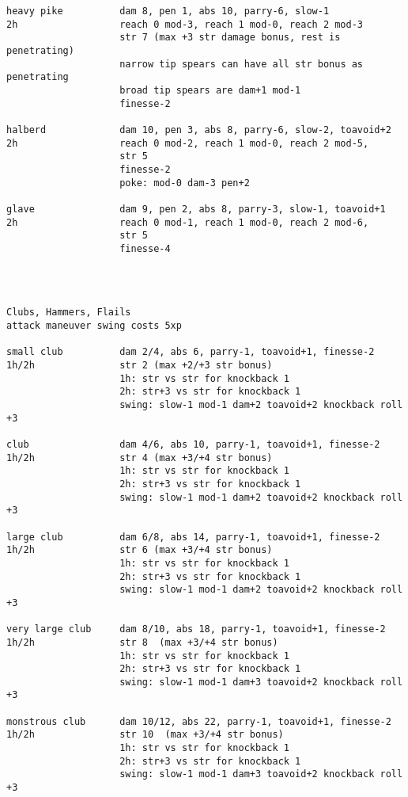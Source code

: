 \begin{verbatim}
heavy pike          dam 8, pen 1, abs 10, parry-6, slow-1
2h                  reach 0 mod-3, reach 1 mod-0, reach 2 mod-3
                    str 7 (max +3 str damage bonus, rest is penetrating)
                    narrow tip spears can have all str bonus as penetrating
                    broad tip spears are dam+1 mod-1
                    finesse-2

halberd             dam 10, pen 3, abs 8, parry-6, slow-2, toavoid+2
2h                  reach 0 mod-2, reach 1 mod-0, reach 2 mod-5,
                    str 5
                    finesse-2
                    poke: mod-0 dam-3 pen+2

glave               dam 9, pen 2, abs 8, parry-3, slow-1, toavoid+1
2h                  reach 0 mod-1, reach 1 mod-0, reach 2 mod-6,
                    str 5
                    finesse-4




\end{verbatim} \pagebreak[3] \begin{verbatim}
Clubs, Hammers, Flails
attack maneuver swing costs 5xp

small club          dam 2/4, abs 6, parry-1, toavoid+1, finesse-2
1h/2h               str 2 (max +2/+3 str bonus)
                    1h: str vs str for knockback 1
                    2h: str+3 vs str for knockback 1
                    swing: slow-1 mod-1 dam+2 toavoid+2 knockback roll +3

club                dam 4/6, abs 10, parry-1, toavoid+1, finesse-2
1h/2h               str 4 (max +3/+4 str bonus)
                    1h: str vs str for knockback 1
                    2h: str+3 vs str for knockback 1
                    swing: slow-1 mod-1 dam+2 toavoid+2 knockback roll +3

large club          dam 6/8, abs 14, parry-1, toavoid+1, finesse-2
1h/2h               str 6 (max +3/+4 str bonus)
                    1h: str vs str for knockback 1
                    2h: str+3 vs str for knockback 1
                    swing: slow-1 mod-1 dam+2 toavoid+2 knockback roll +3

very large club     dam 8/10, abs 18, parry-1, toavoid+1, finesse-2
1h/2h               str 8  (max +3/+4 str bonus)
                    1h: str vs str for knockback 1
                    2h: str+3 vs str for knockback 1
                    swing: slow-1 mod-1 dam+3 toavoid+2 knockback roll +3

monstrous club      dam 10/12, abs 22, parry-1, toavoid+1, finesse-2
1h/2h               str 10  (max +3/+4 str bonus)
                    1h: str vs str for knockback 1
                    2h: str+3 vs str for knockback 1
                    swing: slow-1 mod-1 dam+3 toavoid+2 knockback roll +3


\end{verbatim}

